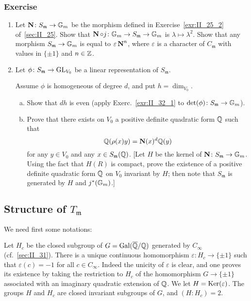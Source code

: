 \subsubsection*{Exercise}
\begin{enumerate}
\item\label{exr:II_32_1} Let $\operatorname{\mathbf{N}} \colon S_\mathfrak{m} \to \mathbb{G}_m$ be the morphism
	defined in Exercise~\ref{exr:II_25_2} of~\ref{sec:II_25}. Show
	that $\operatorname{\mathbf{N}} \circ j \colon \mathbb{G}_m \to S_\mathfrak{m} \to
	\mathbb{G}_m$ is $\lambda \mapsto \lambda^2$.  Show that any morphism
	$S_\mathfrak{m} \to \mathbb{G}_m$ is equal to
	$\varepsilon\operatorname{\mathbf{N}}^{n}$, where $\varepsilon$ is a character
	of $C_\mathfrak{m}$ with values in $\{\pm 1\}$ and $n \in \mathbb{Z}$.
\item Let $\phi \colon S_\mathfrak{m} \to \operatorname{GL}_{V_0}$ be a linear
	representation of $S_\mathfrak{m}$.
	
	Assume $\phi$ is homogeneous of degree $d$, and put $h = \dim_{V_0}$.
	\begin{enumerate}[a)]
	\item Show that $dh$ is even (apply Exerc.~\ref{exr:II_32_1} to
		$\det(\phi) \colon S_\mathfrak{m} \to \mathbb{G}_m$).
	\item Prove that there exists on $V_0$ a positive definite quadratic
		form $\mathbb{Q}$ such that \[ \mathbb{Q}(\rho(x)y) = \operatorname{\mathbf{N}}(x)^d\mathbb{Q}(y) \] for
		any $y \in V_0$ and any $x \in S_\mathfrak{m}(\mathbb{Q})$. [Let $H$ be
		the kernel of $\operatorname{\mathbf{N}} \colon S_\mathfrak{m} \to \mathbb{G}_m$. Using
		the fact that $H(R)$ is compact, prove the existence of a
		positive definite quadratic form $\mathbb{Q}$ on $V_0$ invariant by
		$H$; then note that $S_\mathfrak{m}$ is generated by $H$ and
		$j^{*}(\mathbb{G}_m)$.] 
	\end{enumerate}
\end{enumerate}

\subsection{Structure of \texorpdfstring{$T_{\mathfrak{m}}$}{Tm}}
\label{sec:II_33}
We need first some notations:

Let $H_c$ be the closed subgroup of $G = \operatorname{Gal}(\overline{\mathbb{Q}}/\mathbb{Q})$ generated by
$C_\infty$ (cf.\ \ref{sec:II_31}). There is a unique continuous homomorphism
\dpage
$\varepsilon \colon H_c \to \{ \pm 1 \}$ such that $\varepsilon(c) = -1$ for
all $c \in C_\infty$. Indeed the unicity of $\varepsilon$ is clear, and one
proves its existence by taking the restriction to $H_c$ of the homomorphism $G
\to \{ \pm 1 \}$ associated with an imaginary quadratic extension of $\mathbb{Q}$. We
let $H = \operatorname{Ker}(\varepsilon)$. The groups $H$ and $H_c$ are closed invariant
subgroups of $G$, and $(H: H_c) = 2$.

